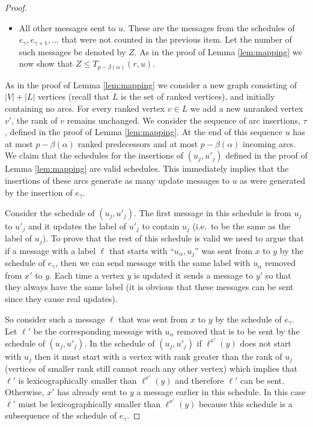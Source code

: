 \documentclass[11pt]{article}
\theoremstyle{plain}
\theoremstyle{definition}
\theoremstyle{remark}
\numberwithin{equation}{section}
\begin{document}
\begin{proof}
\begin{itemize}
    \item \label{split:hard2} All other messages sent to $u$. These are the messages from the schedules of
    $e_\gamma, e_{\gamma+1},\dots$ that were not counted in the previous item. Let the number of such messages be denoted by $Z$. As in the proof of Lemma \ref{lem:mapping} we now show that
    $Z\leq T_{p-\beta(\alpha)}(r,u)$.
  \end{itemize}


As in the proof of Lemma \ref{lem:mapping} we consider a new graph
consisting of $|V|+|L|$ vertices (recall that $L$ is the set of
ranked vertices), and initially containing no arcs. For every ranked
vertex $v\in L$ we add a new unranked vertex $v'$, the rank of $v$
remains unchanged. We consider the sequence of arc insertions,
$\tau$,  defined in the proof of Lemma \ref{lem:mapping}. At the end
of this sequence $u$ has at most $p-\beta(\alpha)$ ranked
predecessors and at most $p-\beta(\alpha)$ incoming arcs. We claim
that the schedules for the insertions of $(u_j,u'_j)$ defined in the
proof of Lemma \ref{lem:mapping} are valid schedules. This
immediately implies that the insertions of these arcs generate as
many update messages to $u$ as were generated by the insertion of
$e_\gamma$.

Consider the schedule of $(u_j,u'_j)$. The first message in this
schedule is from $u_j$ to $u'_j$ and it updates the label of $u'_j$
to contain $u_j$ (i.e.\ to be the same as the label of $u_j$).
 To prove that the rest of this schedule  is
valid  we need to argue that if a message with a label $\ell$ that
starts with ``$u_\alpha,u_j$'' was sent from $x$ to $y$ by the
schedule of $e_\gamma$, then we can send message with the same label
with $u_\alpha$ removed from $x'$ to $y$. Each time a vertex $y$ is
updated it sends a message to $y'$ so that they always have the same
label (it is obvious that these messages can be sent since they
cause real updates).

So consider such a message $\ell$ that was sent from $x$ to $y$ by
the schedule of $e_\gamma$. Let $\ell'$ be the corresponding message
with $u_\alpha$ removed that is to be sent by the schedule of
$(u_j,u'_j)$.  In the schedule of $(u_j,u'_j)$ if
 $\ell^{x'}(y)$ does not start with $u_j$ then it
must start with a vertex with rank greater than the rank of $u_j$
(vertices of smaller rank still cannot reach any other vertex) which
implies that $\ell'$ is lexicographically smaller than
$\ell^{x'}(y)$ and therefore $\ell'$ can be sent. Otherwise, $x'$
has already sent to $y$ a message earlier in this schedule. In this
case $\ell'$ must be lexicographically smaller than $\ell^{x'}(y)$
because this schedule is a subsequence of the schedule of
$e_\gamma$.
\end{proof}







\end{document}
